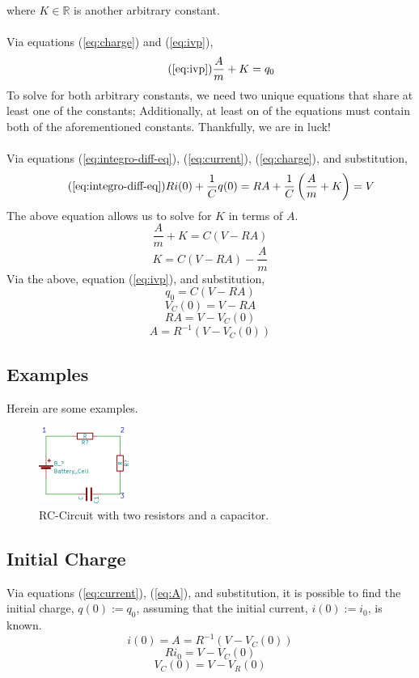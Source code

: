 \documentclass{article}
\begin{document}
	where $K \in \mathbb{R}$ is another arbitrary constant. \\ \\
	Via equations (\ref{eq:charge}) and (\ref{eq:ivp}),
	\begin{equation}\tag{\ref{eq:ivp}}
		\frac{A}{m} + K = q_0
	\end{equation}
	To solve for both arbitrary constants, we need two unique equations that 
	share at least one of the constants;  Additionally, at least 
	on of the equations must contain both of the aforementioned constants.  
	Thankfully, we are in luck! \\ \\
	Via equations (\ref{eq:integro-diff-eq}), (\ref{eq:current}), 
	(\ref{eq:charge}), and substitution,
	\begin{equation}\tag{\ref{eq:integro-diff-eq}}
		Ri(0) + \frac{1}{C}q(0) = RA + \frac{1}{C}\left(\frac{A}{m} + K\right) 
		= V
	\end{equation}
	The above equation allows us to solve for $K$ in terms of $A$.
	$$ \frac{A}{m} + K = C(V - RA)$$
	\begin{equation}\label{eq:K}
		K = C(V-RA) - \frac{A}{m}
	\end{equation}
	Via the above, equation (\ref{eq:ivp}), and substitution,
	$$ q_0 = C(V-RA)$$
	$$ V_C(0) = V-RA$$
	$$ RA = V-V_C(0)$$
	\begin{equation}\label{eq:A}
		A = R^{-1}(V - V_C(0))		
	\end{equation}
	\subsection{Examples}
	Herein are some examples.
	\begin{figure}[H]\label{fig:circuit}
		\caption{RC-Circuit with two resistors and a capacitor.}
		\centering
		\includegraphics[width=0.75\linewidth,height=0.4\linewidth]{g1982}
	\end{figure}
	\subsection{Initial Charge}
	Via equations (\ref{eq:current}), (\ref{eq:A}), and substitution, it is 
	possible to find the initial charge, $q(0):=q_0$, assuming that the initial 
	current, $i(0):=i_0$, is known.
	$$ i(0) = A = R^{-1}(V-V_C(0))$$
	$$ Ri_0 = V- V_C(0)$$
	$$ V_C(0) = V - V_R(0)$$
\end{document}
